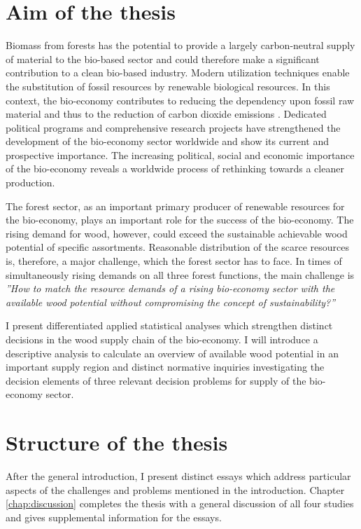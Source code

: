 \section{Aim of the thesis}
\label{sec:intro:aim}
Biomass from forests has the potential to provide a largely carbon-neutral supply of material to the bio-based sector and could therefore make a significant contribution to a clean bio-based industry. Modern utilization techniques enable the substitution of fossil resources by renewable biological resources. In this context, the bio-economy contributes to reducing the dependency upon fossil raw material and thus to the reduction of carbon dioxide emissions \citep[p. 4]{ingrao_2016}. Dedicated political programs and comprehensive research projects have strengthened the development of the bio-economy sector worldwide and show its current and prospective importance. The increasing political, social and economic importance of the bio-economy \citep[e.g.][p. 15-16]{bmel_2014b} reveals a worldwide process of rethinking towards a cleaner production.

The forest sector, as an important primary producer of renewable resources for the bio-economy, plays an important role for the success of the bio-economy. The rising demand for wood, however, could exceed the sustainable achievable wood potential of specific assortments. Reasonable distribution of the scarce resources is, therefore, a major challenge, which the forest sector has to face. In times of simultaneously rising demands on all three forest functions, the main challenge is \textit{''How to match the resource demands of a rising bio-economy sector with the available wood potential without compromising the concept of sustainability?''}

I present differentiated applied statistical analyses which strengthen distinct decisions in the wood supply chain of the bio-economy. I will introduce a descriptive analysis to calculate an overview of available wood potential in an important supply region and distinct normative inquiries investigating the decision elements of three relevant decision problems for supply of the bio-economy sector.
	
\section{Structure of the thesis}
\label{sec:intro:struct}
After the general introduction, I present distinct essays which address particular aspects of the challenges and problems mentioned in the introduction. Chapter \ref{chap:discussion} completes the thesis with a general discussion of all four studies and gives supplemental information for the essays.

